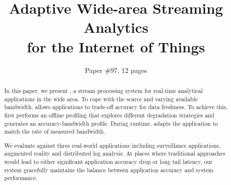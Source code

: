 \documentclass{sig-alternate-10pt}
\begin{document}



\title{Adaptive Wide-area Streaming Analytics \\ for the Internet of Things}

\author{ \alignauthor Paper \#97, 12 pages }

\maketitle

\begin{abstract}
  In this paper, we present \sysname{}, a stream processing system for real-time
  analytical applications in the wide area. To cope with the scarce and varying
  available bandwidth, \sysname{} allows applications to trade-off accuracy for
  data freshness. To achieve this, \sysname{} first performs an offline
  profiling that explores different degradation strategies and generates an
  accuracy-bandwidth profile. During runtime, \sysname{} adapts the application
  to match the rate of measured bandwidth.

  We evaluate \sysname{} against three real-world applications including
  surveillance applications, augmented reality and distributed log analysis. At
  places where traditional approaches would lead to either significant
  application accuracy drop or long tail latency, our system gracefully
  maintains the balance between application accuracy and system performance.
\end{abstract}














{}
\end{document}
